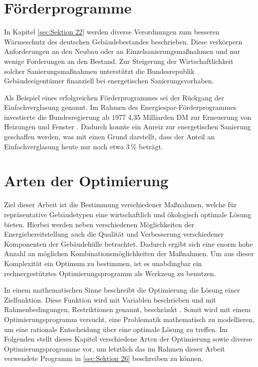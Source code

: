 \section{Förderprogramme}
\label{sec:Sektion 24}

In Kapitel \ref{sec:Sektion 22} werden diverse Verordnungen zum besseren Wärmeschutz des deutschen Gebäudebestandes beschrieben.
Diese verkörpern Anforderungen an den Neubau oder an Einzelsanierungsmaßnahmen und nur wenige Forderungen an den Bestand.
Zur Steigerung der Wirtschaftlichkeit solcher Sanierungsmaßnahmen unterstützt die Bundesrepublik Gebäudeeigentümer finanziell bei energetischen Sanierungsvorhaben.

Als Beispiel eines erfolgreichen Förderprogrammes sei der Rückgang der Einfachverglasung genannt.
Im Rahmen des Energiespar-Förderprogrammes investierte die Bundesregierung ab 1977 4,35 Milliarden DM zur Erneuerung von Heizungen und Fenster \cite{EickeHenning.2011b}.
Dadurch konnte ein Anreiz zur energetischen Sanierung geschaffen werden, was mit einen Grund darstellt, dass der Anteil an Einfachverglasung heute nur noch etwa 3\,\% beträgt.




\section{Arten der Optimierung}
\label{sec:Sektion 25}

Ziel dieser Arbeit ist die Bestimmung verschiedener Maßnahmen, welche für repräsentative Gebäudetypen eine wirtschaftlich und ökologisch optimale Lösung bieten.
Hierbei werden neben verschiedenen Möglichkeiten der Energiebereitstellung auch die Qualität und Verbesserung verschiedener Komponenten der Gebäudehülle betrachtet.
Dadurch ergibt sich eine enorm hohe Anzahl an möglichen Kombinationsmöglichkeiten der Maßnahmen.
Um aus dieser Komplexität ein Optimum zu bestimmen, ist es unabdingbar ein rechnergestütztes Optimierungsprogramm als Werkzeug zu benutzen.

In einem mathematischen Sinne beschreibt die Optimierung die Lösung einer Zielfunktion.
Diese Funktion wird mit Variablen beschrieben und mit Rahmenbedingungen, Restriktionen genannt, beschränkt \cite{Schellong.2016}.
Somit wird mit einem Optimierungsprogramm versucht, eine Problematik mathematisch zu modellieren, um eine rationale Entscheidung über eine optimale Lösung zu treffen. 
Im Folgenden stellt dieses Kapitel verschiedene Arten der Optimierung sowie diverse Optimierungsprogramme vor, um letztlich das im Rahmen dieser Arbeit verwendete Programm in \ref{sec:Sektion 26} beschreiben zu können.

